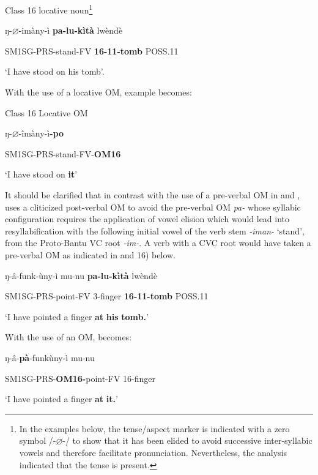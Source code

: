 \documentclass[output=paper]{langscibook}
\begin{document}
           Class 16 locative noun\footnote{In the examples below, the tense/aspect marker is indicated with a zero symbol /-\textrm{${\varnothing}$}{}-/ to show that it has been elided to avoid successive inter-syllabic vowels and therefore facilitate pronunciation. Nevertheless, the analysis indicated that the tense is present.}

ŋ-${\varnothing}${}-imàny-ì           \textbf{pa-lu-kìtà}    lwèndè

SM1SG-PRS-stand-FV    \textbf{16-11-tomb}  POSS.11

\glt ‘I have stood on his tomb’.

With the use of a locative OM, example  becomes:

\ea%
    \label{ex:lukusa:14}
    \z

          Class 16 Locative OM

ŋ-${\varnothing}${}-îmàny-ì\textbf{{}-po}

SM1SG-PRS-stand-FV-\textbf{OM16}

\glt ‘I have stood on \textbf{it}{}'

It should be clarified that in contrast with the use of a pre-verbal OM in  and ,  uses a cliticized post-verbal OM to avoid the pre-verbal OM \textit{pa-} whose syllabic configuration requires the application of vowel elision which would lead into resyllabification with the following initial vowel of the verb stem \textit{{}-iman-} ‘stand’, from the Proto-Bantu VC root \textit{{}-im-}. A verb with a CVC root would have taken a pre-verbal OM as indicated in  and 16) below.

\ea%
    \label{ex:lukusa:15}
    \z

          ŋ-â-funk-ùny-ì         mu-nu    \textbf{pa-lu-kìtà}    lwèndè

    SM1SG-PRS-point-FV    3-finger    \textbf{16-11-tomb}  POSS.11

\glt ‘I have pointed a finger \textbf{at} \textbf{his} \textbf{tomb.}’

With the use of an OM,  becomes:

\ea%
    \label{ex:lukusa:16}
    \z

          ŋ-â-\textbf{pà}{}-funkùny-ì             mu-nu

    SM1SG-PRS-\textbf{OM16-}point-FV    16-finger

\glt ‘I have pointed a finger \textbf{at} \textbf{it.}’
\end{document}
